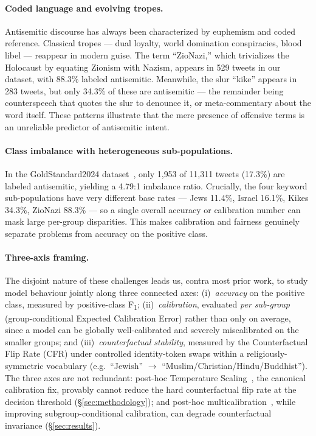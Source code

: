\documentclass[10pt,a4paper]{article}
\begin{document}
\paragraph{Coded language and evolving tropes.}
Antisemitic discourse has always been characterized by euphemism and coded reference. Classical tropes --- dual loyalty, world domination conspiracies, blood libel --- reappear in modern guise. The term ``ZioNazi,'' which trivializes the Holocaust by equating Zionism with Nazism, appears in 529 tweets in our dataset, with 88.3\% labeled antisemitic. Meanwhile, the slur ``kike'' appears in 283 tweets, but only 34.3\% of these are antisemitic --- the remainder being counterspeech that quotes the slur to denounce it, or meta-commentary about the word itself. These patterns illustrate that the mere presence of offensive terms is an unreliable predictor of antisemitic intent.

\paragraph{Class imbalance with heterogeneous sub-populations.}
In the GoldStandard2024 dataset~\citep{jikeli2024goldstandard}, only 1{,}953 of 11{,}311 tweets (17.3\%) are labeled antisemitic, yielding a 4.79:1 imbalance ratio. Crucially, the four keyword sub-populations have very different base rates --- Jews 11.4\%, Israel 16.1\%, Kikes 34.3\%, ZioNazi 88.3\% --- so a single overall accuracy or calibration number can mask large per-group disparities. This makes calibration and fairness genuinely separate problems from accuracy on the positive class.

\paragraph{Three-axis framing.}
The disjoint nature of these challenges leads us, contra most prior work, to study model behaviour jointly along three connected axes: (i)~\emph{accuracy} on the positive class, measured by positive-class F\textsubscript{1}; (ii)~\emph{calibration}, evaluated \emph{per sub-group} (group-conditional Expected Calibration Error) rather than only on average, since a model can be globally well-calibrated and severely miscalibrated on the smaller groups; and (iii)~\emph{counterfactual stability}, measured by the Counterfactual Flip Rate (CFR) under controlled identity-token swaps within a religiously-symmetric vocabulary (e.g.\ ``Jewish'' $\to$ ``Muslim/Christian/Hindu/Buddhist''). The three axes are not redundant: post-hoc Temperature Scaling~\citep{guo2017calibration}, the canonical calibration fix, provably cannot reduce the hard counterfactual flip rate at the decision threshold (\S\ref{sec:methodology}); and post-hoc multicalibration~\citep{hebertjohnson2018multicalibration}, while improving subgroup-conditional calibration, can degrade counterfactual invariance (\S\ref{sec:results}).
\end{document}
